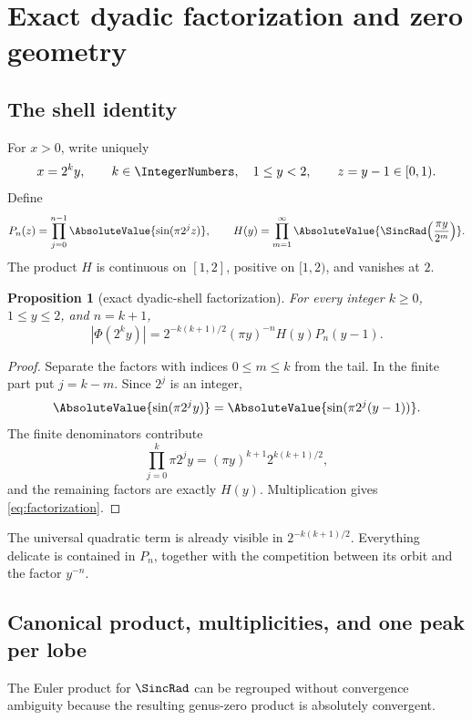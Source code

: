 \documentclass[11pt,oneside]{article}
\newtheorem{proposition}[theorem]{Proposition}
\theoremstyle{definition}
\theoremstyle{remark}
\begin{document}
\section{Exact dyadic factorization and zero geometry}
\label{sec:factorization}

\subsection{The shell identity}

For \(x>0\), write uniquely
\[
 x=2^ky,
 \qquad k\in\IntegerNumbers,\quad 1\le y<2,
 \qquad z=y-1\in[0,1).
\]
Define
\begin{equation}
 P_n(z)=\prod_{j=0}^{n-1}\AbsoluteValue{\sin(\pi2^jz)},
 \qquad
 H(y)=\prod_{m=1}^{\infty}\AbsoluteValue{\SincRad\!\left(\frac{\pi y}{2^m}\right)}.
 \label{eq:P-H}
\end{equation}
The product \(H\) is continuous on \([1,2]\), positive on \([1,2)\), and
vanishes at \(2\).

\begin{proposition}[exact dyadic-shell factorization]
\label{prop:factorization}
For every integer \(k\ge0\), \(1\le y\le2\), and \(n=k+1\),
\begin{equation}
 \boxed{
 |\Phi(2^ky)|
 =2^{-k(k+1)/2}(\pi y)^{-n}H(y)P_n(y-1).}
 \label{eq:factorization}
\end{equation}
\end{proposition}

\begin{proof}
Separate the factors with indices \(0\le m\le k\) from the tail.  In the
finite part put \(j=k-m\).  Since \(2^j\) is an integer,
\[
 \AbsoluteValue{\sin(\pi2^jy)}=\AbsoluteValue{\sin(\pi2^j(y-1))}.
\]
The finite denominators contribute
\[
 \prod_{j=0}^k \pi2^jy=(\pi y)^{k+1}2^{k(k+1)/2},
\]
and the remaining factors are exactly \(H(y)\).  Multiplication gives
\eqref{eq:factorization}.
\end{proof}

The universal quadratic term is already visible in
\(2^{-k(k+1)/2}\).  Everything delicate is contained in \(P_n\), together
with the competition between its orbit and the factor \(y^{-n}\).

\subsection{Canonical product, multiplicities, and one peak per lobe}

The Euler product for \(\SincRad\) can be regrouped without convergence
ambiguity because the resulting genus-zero product is absolutely convergent.
\end{document}
